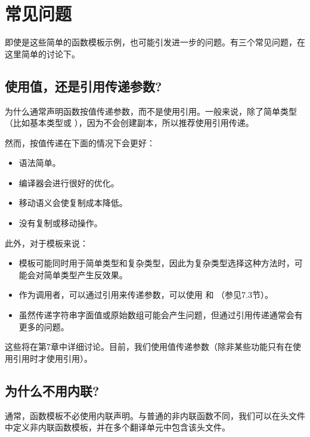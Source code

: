 \section{常见问题}

即使是这些简单的函数模板示例，也可能引发进一步的问题。有三个常见问题，在这里简单的讨论下。

\subsection{使用值，还是引用传递参数?}

为什么通常声明函数按值传递参数，而不是使用引用。一般来说，除了简单类型（比如基本类型或 ），因为不会创建副本，所以推荐使用引用传递。

然而，按值传递在下面的情况下会更好：

\begin{itemize}
\item
语法简单。

\item 
编译器会进行很好的优化。

\item
移动语义会使复制成本降低。

\item 
没有复制或移动操作。
\end{itemize}

此外，对于模板来说：

\begin{itemize}
\item
模板可能同时用于简单类型和复杂类型，因此为复杂类型选择这种方法时，可能会对简单类型产生反效果。

\item 
作为调用者，可以通过引用来传递参数，可以使用  和 （参见7.3节）。

\item
虽然传递字符串字面值或原始数组可能会产生问题，但通过引用传递通常会有更多的问题。
\end{itemize}

这些将在第7章中详细讨论。目前，我们使用值传递参数（除非某些功能只有在使用引用时才使用引用）。

\subsection{为什么不用内联?}
 
通常，函数模板不必使用内联声明。与普通的非内联函数不同，我们可以在头文件中定义非内联函数模板，并在多个翻译单元中包含该头文件。

